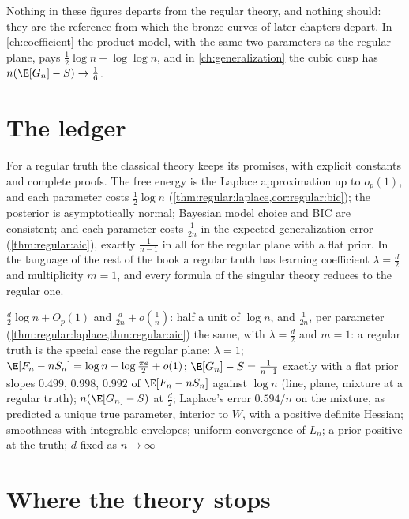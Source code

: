 \begin{refsection}
Nothing in these figures departs from the regular theory, and nothing should: they are the reference from which the bronze curves of later chapters depart. In \cref{ch:coefficient} the product model, with the same two parameters as the regular plane, pays $\frac12\log n-\log\log n$, and in \cref{ch:generalization} the cubic cusp has $n(\E[G_n]-S)\to\frac16$.

\section{The ledger}\label{sec:regular:ledger}

For a regular truth the classical theory keeps its promises, with explicit constants and complete proofs. The free energy is the Laplace approximation up to $o_p(1)$, and each parameter costs $\frac12\log n$ (\cref{thm:regular:laplace,cor:regular:bic}); the posterior is asymptotically normal; Bayesian model choice and BIC are consistent; and each parameter costs $\frac1{2n}$ in the expected generalization error (\cref{thm:regular:aic}), exactly $\frac1{n-1}$ in all for the regular plane with a flat prior. In the language of the rest of the book a regular truth has learning coefficient $\lambda=\frac d2$ and multiplicity $m=1$, and every formula of the singular theory reduces to the regular one.

{$\frac d2\log n+O_p(1)$ and $\frac d{2n}+o(\frac1n)$: half a unit of $\log n$, and $\frac1{2n}$, per parameter (\cref{thm:regular:laplace,thm:regular:aic})}
{the same, with $\lambda=\frac d2$ and $m=1$: a regular truth is the special case}
{the regular plane: $\lambda=1$; $\E[F_n-nS_n]=\log n-\log\frac{\pi e}2+o(1)$; $\E[G_n]-S=\frac1{n-1}$ exactly with a flat prior}
{slopes $0.499$, $0.998$, $0.992$ of $\E[F_n-nS_n]$ against $\log n$ (line, plane, mixture at a regular truth); $n(\E[G_n]-S)$ at $\frac d2$; Laplace's error $0.594/n$ on the mixture, as predicted}
{a unique true parameter, interior to $W$, with a positive definite Hessian; smoothness with integrable envelopes; uniform convergence of $L_n$; a prior positive at the truth; $d$ fixed as $n\to\infty$}

\section{Where the theory stops}\label{sec:regular:stops}


\end{refsection}
